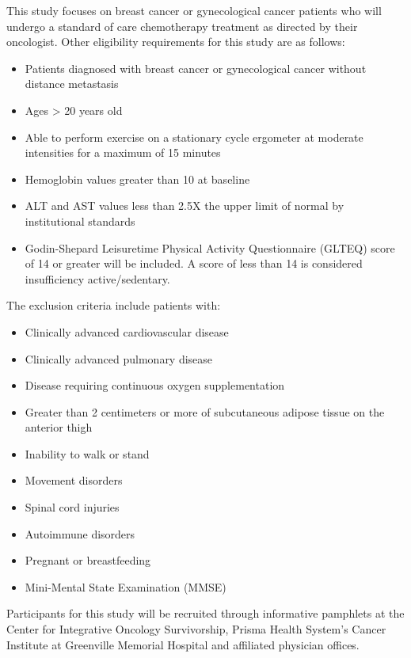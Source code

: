 \documentclass[
]{book}
\providecommand{\tightlist}{%
  \setlength{\itemsep}{0pt}\setlength{\parskip}{0pt}}
\begin{document}
This study focuses on breast cancer or gynecological cancer patients who will undergo a standard of care chemotherapy treatment as directed by their oncologist.
Other eligibility requirements for this study are as follows:

\begin{itemize}
\tightlist
\item
  Patients diagnosed with breast cancer or gynecological cancer without distance metastasis
\item
  Ages \textgreater{} 20 years old
\item
  Able to perform exercise on a stationary cycle ergometer at moderate intensities for a maximum of 15 minutes
\item
  Hemoglobin values greater than 10 at baseline
\item
  ALT and AST values less than 2.5X the upper limit of normal by institutional standards
\item
  Godin-Shepard Leisuretime Physical Activity Questionnaire (GLTEQ) score of 14 or greater will be included. A score of less than 14 is considered insufficiency active/sedentary.
\end{itemize}

The exclusion criteria include patients with:

\begin{itemize}
\tightlist
\item
  Clinically advanced cardiovascular disease
\item
  Clinically advanced pulmonary disease
\item
  Disease requiring continuous oxygen supplementation
\item
  Greater than 2 centimeters or more of subcutaneous adipose tissue on the anterior thigh
\item
  Inability to walk or stand
\item
  Movement disorders
\item
  Spinal cord injuries
\item
  Autoimmune disorders
\item
  Pregnant or breastfeeding
\item
  Mini-Mental State Examination (MMSE)
\end{itemize}

Participants for this study will be recruited through informative pamphlets at the Center for Integrative Oncology Survivorship, Prisma Health System's Cancer Institute at Greenville Memorial Hospital and affiliated physician offices.
\end{document}
